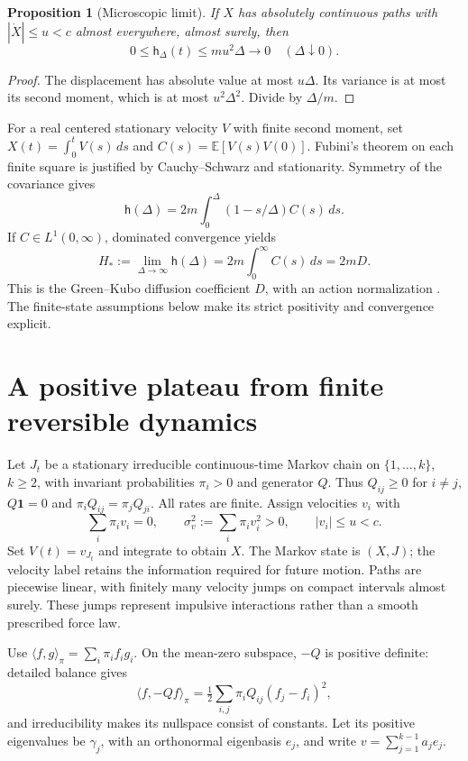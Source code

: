 \documentclass[11pt,a4paper]{article}
\newtheorem{proposition}{Proposition}
\newcommand{\E}{\mathbb E}
\newcommand{\ha}{\mathsf h}
\begin{document}
\begin{proposition}[Microscopic limit]\label{prop:short}
If $X$ has absolutely continuous paths with $|\dot X|\le u<c$ almost
everywhere, almost surely, then
\[
 0\le\ha_\Delta(t)\le m u^2\Delta\longrightarrow0
 \quad(\Delta\downarrow0).
\]
\end{proposition}
\begin{proof}
The displacement has absolute value at most $u\Delta$.
Its variance is at most its second moment, which is at most $u^2\Delta^2$.
Divide by $\Delta/m$.
\end{proof}

For a real centered stationary velocity $V$ with finite second moment, set
$X(t)=\int_0^t V(s)\,ds$ and $C(s)=\E[V(s)V(0)]$. Fubini's theorem on
each finite square is justified by Cauchy--Schwarz and stationarity. Symmetry
of the covariance gives
\begin{equation}\label{eq:correlation}
 \ha(\Delta)=2m\int_0^\Delta(1-s/\Delta)C(s)\,ds.
\end{equation}
If $C\in L^1(0,\infty)$, dominated convergence yields
\begin{equation}\label{eq:gk}
 H_*:=\lim_{\Delta\to\infty}\ha(\Delta)
 =2m\int_0^\infty C(s)\,ds=2mD.
\end{equation}
This is the Green--Kubo diffusion coefficient $D$, with an action normalization
\cite[(1.3), Proposition 2.1]{Pavliotis2010}. The finite-state assumptions
below make its strict positivity and convergence explicit.

\section{A positive plateau from finite reversible dynamics}
Let $J_t$ be a stationary irreducible continuous-time Markov chain on
$\{1,\ldots,k\}$, $k\ge2$, with invariant probabilities $\pi_i>0$ and
generator $Q$. Thus $Q_{ij}\ge0$ for $i\ne j$, $Q\mathbf1=0$ and
$\pi_iQ_{ij}=\pi_jQ_{ji}$. All rates are finite. Assign velocities $v_i$ with
\[
 \sum_i\pi_i v_i=0,\qquad \sigma_v^2:=\sum_i\pi_i v_i^2>0,
 \qquad |v_i|\le u<c.
\]
Set $V(t)=v_{J_t}$ and integrate to obtain $X$. The Markov state is $(X,J)$;
the velocity label retains the information required for future motion.
Paths are piecewise linear, with finitely many velocity jumps on compact
intervals almost surely. These jumps represent impulsive interactions rather
than a smooth prescribed force law.

Use $\langle f,g\rangle_\pi=\sum_i\pi_if_ig_i$. On the mean-zero
subspace, $-Q$ is positive definite: detailed balance gives
\[
 \langle f,-Qf\rangle_\pi
 =\tfrac12\sum_{i,j}\pi_iQ_{ij}(f_j-f_i)^2,
\]
and irreducibility makes its nullspace consist of constants. Let its positive
eigenvalues be $\gamma_j$, with an orthonormal eigenbasis $e_j$, and write
$v=\sum_{j=1}^{k-1}a_je_j$.
\end{document}
